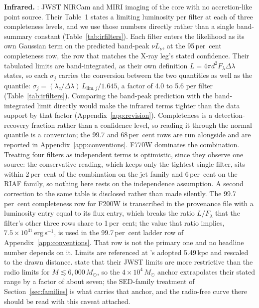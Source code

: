 \documentclass[11pt]{article}
\newcommand{\msun}{\ensuremath{M_\odot}}
\begin{document}
\textbf{Infrared.} \citet{Chen2025JWST}: JWST NIRCam and MIRI imaging of the core with no accretion-like point source. Their Table~1 states a limiting luminosity per filter at each of three completeness levels, and we use those numbers directly rather than a single band-summary constant (Table~\ref{tab:irfilters}). Each filter enters the likelihood as its own Gaussian term on the predicted band-peak $\nu L_{\nu}$, at the 95\,per~cent completeness row, the row that matches the X-ray leg's stated confidence. Their tabulated limits are band-integrated, as their own definition $L = 4\pi d^{2}F_{\lambda}\Delta\lambda$ states, so each $\sigma_{j}$ carries the conversion between the two quantities as well as the quantile: $\sigma_{j} = (\lambda_{c}/\Delta\lambda)\,L_{\mathrm{lim},j}/1.645$, a factor of 4.0 to 5.6 per filter (Table~\ref{tab:irfilters}). Comparing the band-peak prediction with the band-integrated limit directly would make the infrared terms tighter than the data support by that factor (Appendix~\ref{app:revision}). Completeness is a detection-recovery fraction rather than a confidence level, so reading it through the normal quantile is a convention; the 99.7 and 68\,per~cent rows are run alongside and are reported in Appendix~\ref{app:conventions}. F770W dominates the combination. Treating four filters as independent terms is optimistic, since they observe one source: the conservative reading, which keeps only the tightest single filter, sits within 2\,per~cent of the combination on the jet family and 6\,per~cent on the RIAF family, so nothing here rests on the independence assumption. A second correction to the same table is disclosed rather than made silently. The 99.7\,per~cent completeness row for F200W is transcribed in the provenance file with a luminosity entry equal to its flux entry, which breaks the ratio $L/F_{\lambda}$ that the filter's other three rows share to 1\,per~cent; the value that ratio implies, $7.5\times10^{31}\,\mathrm{erg\,s^{-1}}$, is used in the 99.7\,per~cent ladder row of Appendix~\ref{app:conventions}. That row is not the primary one and no headline number depends on it. Limits are referenced at \citeauthor{Chen2025JWST}'s adopted 5.49\,kpc and rescaled to the drawn distance. \citet{Chen2025JWST} state that their JWST limits are more restrictive than the radio limits for $M \lesssim 6{,}000\,\msun$, so the $4\times10^{4}\,\msun$ anchor extrapolates their stated range by a factor of about seven; the SED-family treatment of Section~\ref{sec:families} is what carries that anchor, and the radio-free curve there should be read with this caveat attached.
\end{document}

